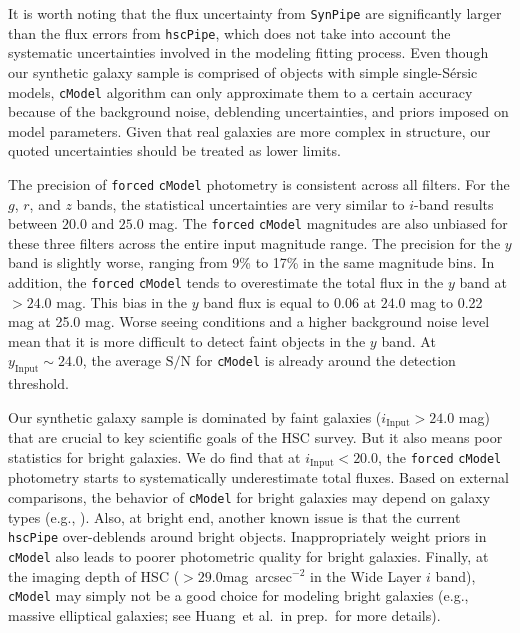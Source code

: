 \documentclass[useamsfonts]{pasj01}
\def\sb{mag~arcsec$^{-2}$}
\def\etal{{\ et al.~}}
\def\ser{{S\'{e}rsic\ }}
\def\hscpipe{\texttt{hscPipe}}
\def\synpipe{\texttt{SynPipe}}
\def\cmodel{\texttt{cModel}}
\def\forced{\texttt{forced}}
\def\s2n{{$\mathrm{S}/\mathrm{N}$}}
\newcommand{\minus}{\raisebox{.4\height}{\scalebox{.8}{-}}}
\begin{document}
    It is worth noting that the flux uncertainty from \synpipe{} are significantly 
    larger than the flux errors from \hscpipe{}, which does not take into account the 
    systematic uncertainties involved in the modeling fitting process. 
    Even though our synthetic galaxy sample is comprised of objects with simple 
    single-\ser{} models, \cmodel{} algorithm can only approximate them to a certain 
    accuracy because of the background noise, deblending uncertainties, and priors 
    imposed on model parameters. 
    Given that real galaxies are more complex in structure, our quoted uncertainties 
    should be treated as lower limits.


    The precision of \forced{} \cmodel{} photometry is consistent across all filters.
    For the $g$, $r$, and $z$ bands, the statistical uncertainties are very similar to
    $i$-band results between $20.0$ and $25.0$ mag.
    The \forced{} \cmodel{} magnitudes are also unbiased for these three filters
    across the entire input magnitude range.
    The precision for the $y$ band is slightly worse, ranging from 9\% to 17\% in the
    same magnitude bins.
    In addition, the \forced{} \cmodel{} tends to overestimate the total flux in 
    the $y$ band at $>24.0$ mag. 
    This bias in the $y$ band flux is equal to \minus{}0.06 at $24.0$ mag to 
    \minus{}0.22 mag at 25.0 mag. 
    Worse seeing conditions and a higher background noise level mean that it is more
    difficult to detect faint objects in the $y$ band.
    At $y_{\mathrm{Input}}{\sim}24.0$, the average \s2n{} for \cmodel{} is already
    around the detection threshold.

    Our synthetic galaxy sample is dominated by faint galaxies 
    ($i_{\mathrm{Input}} > 24.0$ mag) that are crucial to key scientific goals of the 
    HSC survey.
    But it also means poor statistics for bright galaxies. 
    We do find that at $i_{\mathrm{Input}}<20.0$, the \forced{} \cmodel{} photometry 
    starts to systematically underestimate total fluxes. 
    Based on external comparisons, the behavior of \cmodel{} for bright galaxies may 
    depend on galaxy types (e.g., \citealt{HSCDR1}).  
    Also, at bright end, another known issue is that the current \hscpipe{}
    over-deblends around bright objects. 
    Inappropriately weight priors in \cmodel{} also leads to poorer photometric 
    quality for bright galaxies.  
    Finally, at the imaging depth of HSC ($>29.0$\sb{} in the Wide Layer $i$ band),  
    \cmodel{} may simply not be a good choice for modeling bright galaxies 
    (e.g., massive elliptical galaxies; see Huang\etal in prep.~for more details).
\end{document}
